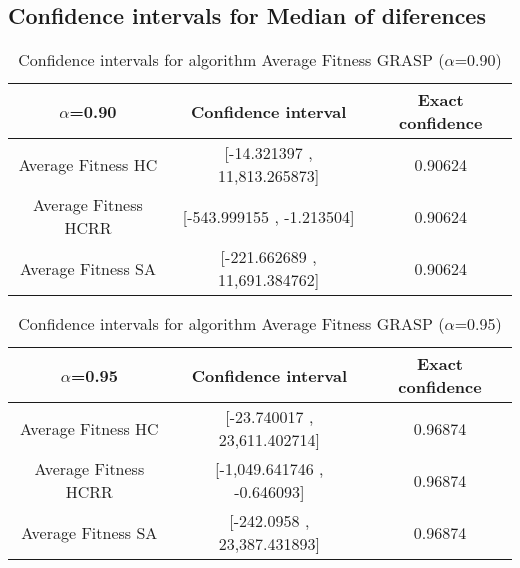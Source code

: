 \documentclass[a4paper,10pt]{article}
\begin{document}
\subsection{Confidence intervals for Median of diferences}

\begin{table}[!htp]
\centering\small
\begin{tabular}{
|c|c|c|}
\hline
 $\alpha$=0.90 & Confidence interval & Exact confidence \\ \hline 
Average Fitness HC     & [-14.321397 , 11,813.265873] & 0.90624\\ \hline 
Average Fitness HCRR    & [-543.999155 , -1.213504] & 0.90624\\ \hline 
Average Fitness SA   & [-221.662689 , 11,691.384762] & 0.90624\\ \hline 

\end{tabular}
\caption{Confidence intervals for algorithm Average Fitness GRASP ($\alpha$=0.90)}
\end{table}
\begin{table}[!htp]
\centering\small
\begin{tabular}{
|c|c|c|}
\hline
 $\alpha$=0.95 & Confidence interval & Exact confidence \\ \hline 
Average Fitness HC     & [-23.740017 , 23,611.402714] & 0.96874\\ \hline 
Average Fitness HCRR    & [-1,049.641746 , -0.646093] & 0.96874\\ \hline 
Average Fitness SA   & [-242.0958 , 23,387.431893] & 0.96874\\ \hline 

\end{tabular}
\caption{Confidence intervals for algorithm Average Fitness GRASP ($\alpha$=0.95)}
\end{table}

 \clearpage 
\end{document}
